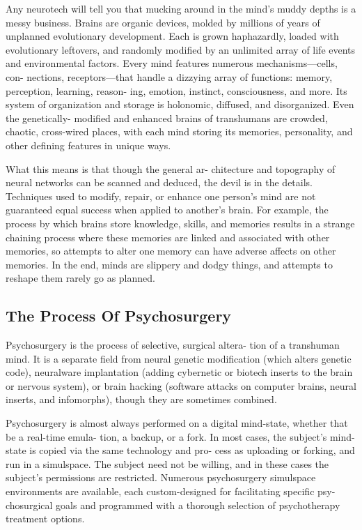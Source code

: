 Any neurotech will tell you that mucking around 
in the mind's muddy depths is a messy business. 
Brains are organic devices, molded by millions of 
years of unplanned evolutionary development. Each 
is grown haphazardly, loaded with evolutionary 
leftovers, and randomly modified by an unlimited 
array of life events and environmental factors. Every 
mind features numerous mechanisms—cells, con-
nections, receptors—that handle a dizzying array 
of functions: memory, perception, learning, reason-
ing, emotion, instinct, consciousness, and more. Its 
system of organization and storage is holonomic, 
diffused, and disorganized. Even the genetically-
modified and enhanced brains of transhumans are 
crowded, chaotic, cross-wired places, with each 
mind storing its memories, personality, and other 
defining features in unique ways.

What this means is that though the general ar-
chitecture and topography of neural networks can 
be scanned and deduced, the devil is in the details. 
Techniques used to modify, repair, or enhance one 
person's mind are not guaranteed equal success 
when applied to another's brain. For example, the 
process by which brains store knowledge, skills, and 
memories results in a strange chaining process where 
these memories are linked and associated with other 
memories, so attempts to alter one memory can 
have adverse affects on other memories. In the end, 
minds are slippery and dodgy things, and attempts 
to reshape them rarely go as planned.

\subsection{The Process Of Psychosurgery}

Psychosurgery is the process of selective, surgical altera-
tion of a transhuman mind. It is a separate field from 
neural genetic modification (which alters genetic code), 
neuralware implantation (adding cybernetic or biotech 
inserts to the brain or nervous system), or brain hacking 
(software attacks on computer brains, neural inserts, and 
infomorphs), though they are sometimes combined.

Psychosurgery is almost always performed on a 
digital mind-state, whether that be a real-time emula-
tion, a backup, or a fork. In most cases, the subject's 
mind-state is copied via the same technology and pro-
cess as uploading or forking, and run in a simulspace. 
The subject need not be willing, and in these cases 
the subject's permissions are restricted. Numerous 
psychosurgery simulspace environments are available, 
each custom-designed for facilitating specific  psy-
chosurgical goals and programmed with a thorough 
selection of psychotherapy treatment options.

